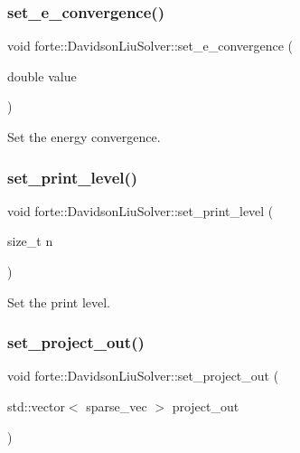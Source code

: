 \subsubsection{\texorpdfstring{set\+\_\+e\+\_\+convergence()}{set\_e\_convergence()}}
{\footnotesize\ttfamily void forte\+::\+Davidson\+Liu\+Solver\+::set\+\_\+e\+\_\+convergence (\begin{DoxyParamCaption}\item[{double}]{value }\end{DoxyParamCaption})}



Set the energy convergence. 

\mbox{\label{classforte_1_1_davidson_liu_solver_a833b7e36f2e1b45e0e1ebe656a2eb826}} 
\subsubsection{\texorpdfstring{set\+\_\+print\+\_\+level()}{set\_print\_level()}}
{\footnotesize\ttfamily void forte\+::\+Davidson\+Liu\+Solver\+::set\+\_\+print\+\_\+level (\begin{DoxyParamCaption}\item[{size\+\_\+t}]{n }\end{DoxyParamCaption})}



Set the print level. 

\mbox{\label{classforte_1_1_davidson_liu_solver_a6e41d496aef9fa83c557b513b52e4d6f}} 
\subsubsection{\texorpdfstring{set\+\_\+project\+\_\+out()}{set\_project\_out()}}
{\footnotesize\ttfamily void forte\+::\+Davidson\+Liu\+Solver\+::set\+\_\+project\+\_\+out (\begin{DoxyParamCaption}\item[{std\+::vector$<$ sparse\+\_\+vec $>$}]{project\+\_\+out }\end{DoxyParamCaption})}

